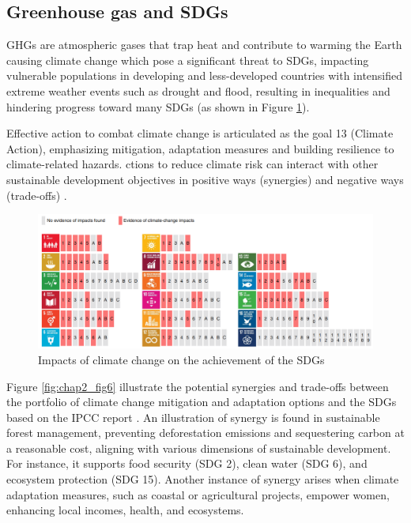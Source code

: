 \subsection{Greenhouse gas and SDGs}
GHGs are atmospheric gases that trap heat and contribute to warming the Earth causing climate change which pose a significant threat to SDGs, impacting vulnerable populations in developing and less-developed countries with intensified extreme weather events such as drought and flood, resulting in inequalities and hindering progress toward many SDGs (as shown in Figure \ref{fig:chap2_fig5}). \par
Effective action to combat climate change is articulated as the goal 13 (Climate Action), emphasizing mitigation, adaptation measures and building resilience to climate-related hazards. ctions to reduce climate risk can interact with other sustainable development objectives in positive ways (synergies) and negative ways (trade-offs) \citep{lee2023climate}. 
\begin{figure}[tbh!]
    \centering
    \includegraphics[width=\textwidth]{figs/chap2/impact_cc_to_sdgs.png}
    \caption{Impacts of climate change on the achievement of the SDGs \citep{fuso2019connecting}}
    \label{fig:chap2_fig5}
\end{figure}
Figure \ref{fig:chap2_fig6} illustrate the potential synergies and trade-offs between the portfolio of climate change mitigation and adaptation options and the SDGs based on the IPCC report \citep{lee2023climate}. An illustration of synergy is found in sustainable forest management, preventing deforestation emissions and sequestering carbon at a reasonable cost, aligning with various dimensions of sustainable development. For instance, it supports food security (SDG 2), clean water (SDG 6), and ecosystem protection (SDG 15). Another instance of synergy arises when climate adaptation measures, such as coastal or agricultural projects, empower women, enhancing local incomes, health, and ecosystems. \par
